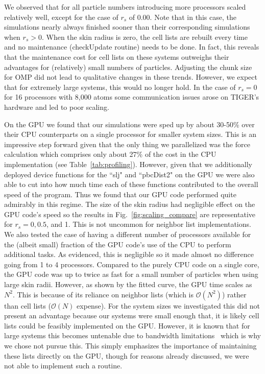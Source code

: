 \documentclass[12pt]{article}
\begin{document}
We observed that for all particle numbers introducing more processors scaled relatively well, except for the case of $r_{s}$ of 0.00. Note that in this case, the simulations nearly always finished sooner than their corresponding simulations when $r_s > 0$.  When the skin radius is zero, the cell lists are rebuilt every time and no maintenance (checkUpdate routine) needs to be done.  In fact, this reveals that the maintenance cost for cell lists on these systems outweighs their advantages for (relatively) small numbers of particles.  Adjusting the chunk size for OMP did not lead to qualitative changes in these trends.  However, we expect that for extremely large systems, this would no longer hold.  In the case of $r_s = 0$ for 16 processors with 8,000 atoms some communication issues arose on TIGER's hardware and led to poor scaling.  

On the GPU we found that our simulations were sped up by about 30-50\% over their CPU counterparts on a single processor for smaller system sizes.  This is an impressive step forward given that the only thing we parallelized was the force calculation which comprises only about 27\% of the cost in the CPU implementation (see Table~\ref{tab:profiling}).  However, given that we additionally deployed device functions for the ``slj" and ``pbcDist2" on the GPU we were also able to cut into how much time each of these functions contributed to the overall speed of the program.  Thus we found that our GPU code performed quite admirably in this regime.  The size of the skin radius had negligible effect on the GPU code's speed so the results in Fig.~\ref{fig:scaling_compare} are representative for $r_s = 0,0.5$, and 1.  This is not uncommon for neighbor list implementations.  We also tested the case of having a different number of processors available for the (albeit small) fraction of the GPU code's use of the CPU to perform additional tasks.  As evidenced, this is negligible so it made almost no difference going from 1 to 4 processors.  Compared to the purely CPU code on a single core, the GPU code was up to twice as fast for a small number of particles when using large skin radii.  However, as shown by the fitted curve, the GPU time scales as $N^2$.  This is because of its reliance on neighbor lists (which is $\mathcal{O}(N^2)$) rather than cell lists ($\mathcal{O}(N)$ expense).  For the system sizes we investigated this did not present an advantage because our systems were small enough that, it is likely cell lists could be feasibly implemented on the GPU.   However, it is known that for large systems this becomes untenable due to bandwidth limitations~\cite{Anderson2008, Lipscomb2012} which is why we chose not pursue this.  This simply emphasizes the importance of maintaining these lists directly on the GPU, though for reasons already discussed, we were not able to implement such a routine.
\end{document}
